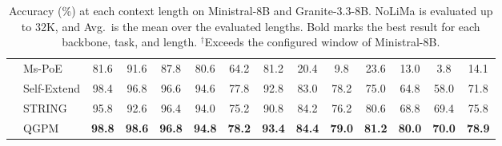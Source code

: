 \documentclass[11pt]{article}
\begin{document}
\begin{table}[t]
\begin{tabular*}{\textwidth}{@{\extracolsep{\fill}} ll cccccc @{\hspace{10pt}} cccccc @{}}
 & Ms-PoE & \phantom{0}81.6 & \phantom{0}91.6 & \phantom{0}87.8 & \phantom{0}80.6 & \phantom{0}64.2 & \phantom{0}81.2 & \phantom{0}20.4 & \phantom{00}9.8 & \phantom{0}23.6 & \phantom{0}13.0 & \phantom{00}3.8 & \phantom{0}14.1 \\
 & Self-Extend & \phantom{0}98.4 & \phantom{0}96.8 & \phantom{0}96.6 & \phantom{0}94.6 & \phantom{0}77.8 & \phantom{0}92.8 & \phantom{0}83.0 & \phantom{0}78.2 & \phantom{0}75.0 & \phantom{0}64.8 & \phantom{0}58.0 & \phantom{0}71.8 \\
 & STRING & \phantom{0}95.8 & \phantom{0}92.6 & \phantom{0}96.4 & \phantom{0}94.0 & \phantom{0}75.2 & \phantom{0}90.8 & \phantom{0}84.2 & \phantom{0}76.2 & \phantom{0}80.6 & \phantom{0}68.8 & \phantom{0}69.4 & \phantom{0}75.8 \\
 & QGPM & \textbf{\phantom{0}98.8} & \textbf{\phantom{0}98.6} & \textbf{\phantom{0}96.8} & \textbf{\phantom{0}94.8} & \textbf{\phantom{0}78.2} & \textbf{\phantom{0}93.4} & \textbf{\phantom{0}84.4} & \textbf{\phantom{0}79.0} & \textbf{\phantom{0}81.2} & \textbf{\phantom{0}80.0} & \textbf{\phantom{0}70.0} & \textbf{\phantom{0}78.9} \\
\bottomrule
\end{tabular*}
\caption{Accuracy (\%) at each context length on Ministral-8B and Granite-3.3-8B. NoLiMa is evaluated up to 32K, and Avg.\ is the mean over the evaluated lengths. Bold marks the best result for each backbone, task, and length. $^{\dagger}$Exceeds the configured window of Ministral-8B.}
\label{tab:full-other}
\end{table}
\end{document}
